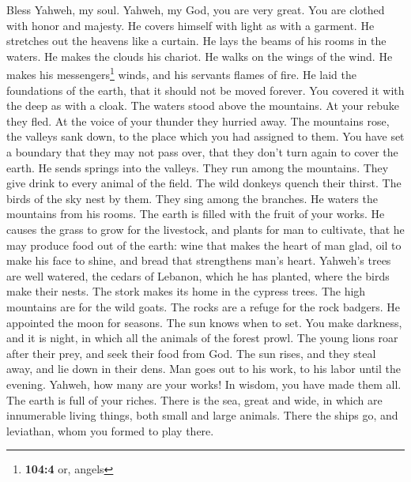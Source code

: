  Bless Yahweh, my soul. Yahweh, my God, you are very
great. You are clothed with honor and majesty.  He covers
himself with light as with a garment. He stretches out the heavens like
a curtain.  He lays the beams of his rooms in the waters.
He makes the clouds his chariot. He walks on the wings of the wind.
 He makes his messengers\footnote{\textbf{104:4} or,
  angels} winds, and his servants flames of fire.  He laid
the foundations of the earth, that it should not be moved forever.
 You covered it with the deep as with a cloak. The waters
stood above the mountains.  At your rebuke they fled. At
the voice of your thunder they hurried away.  The
mountains rose, the valleys sank down, to the place which you had
assigned to them.  You have set a boundary that they may
not pass over, that they don't turn again to cover the earth.
 He sends springs into the valleys. They run among the
mountains.  They give drink to every animal of the field.
The wild donkeys quench their thirst.  The birds of the
sky nest by them. They sing among the branches.  He
waters the mountains from his rooms. The earth is filled with the fruit
of your works.  He causes the grass to grow for the
livestock, and plants for man to cultivate, that he may produce food out
of the earth:  wine that makes the heart of man glad, oil
to make his face to shine, and bread that strengthens man's heart.
 Yahweh's trees are well watered, the cedars of Lebanon,
which he has planted,  where the birds make their nests.
The stork makes its home in the cypress trees.  The high
mountains are for the wild goats. The rocks are a refuge for the rock
badgers.  He appointed the moon for seasons. The sun
knows when to set.  You make darkness, and it is night,
in which all the animals of the forest prowl.  The young
lions roar after their prey, and seek their food from God.
 The sun rises, and they steal away, and lie down in
their dens.  Man goes out to his work, to his labor until
the evening.  Yahweh, how many are your works! In wisdom,
you have made them all. The earth is full of your riches.
 There is the sea, great and wide, in which are
innumerable living things, both small and large animals. 
There the ships go, and leviathan, whom you formed to play there.
